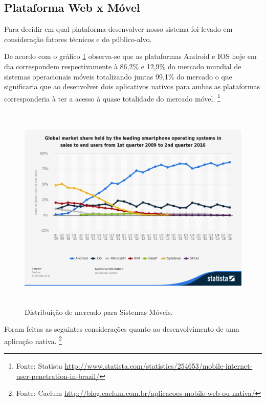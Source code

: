 \subsection{Plataforma Web x Móvel}
\par Para decidir em qual plataforma desenvolver nosso sistema foi levado em consideração fatores técnicos e do público-alvo.
\par De acordo com o gráfico \ref{fig:global_market_sharing} observa-se que as plataformas Android e IOS hoje em dia correspondem respectivamente à 86,2\% e 12,9\% do mercado mundial de sistemas operacionais móveis totalizando juntas 99,1\% do mercado o que significaria que ao desenvolver dois aplicativos nativos para ambas as plataformas corresponderia à ter a acesso à quase totalidade do mercado móvel. \footnote{Fonte: Statista \url{http://www.statista.com/statistics/254653/mobile-internet-user-penetration-in-brazil/}}
\begin{figure}[htb]
\includegraphics[height=10cm]{figuras/global_market_sharing}
\caption{\label{fig:global_market_sharing} Distribuição de mercado para Sistemas Móveis.}
\end{figure}
\par Foram feitas as seguintes considerações quanto ao desenvolvimento de uma aplicação nativa. \footnote{Fonte: Caelum \url{http://blog.caelum.com.br/aplicacoes-mobile-web-ou-nativa/}}
